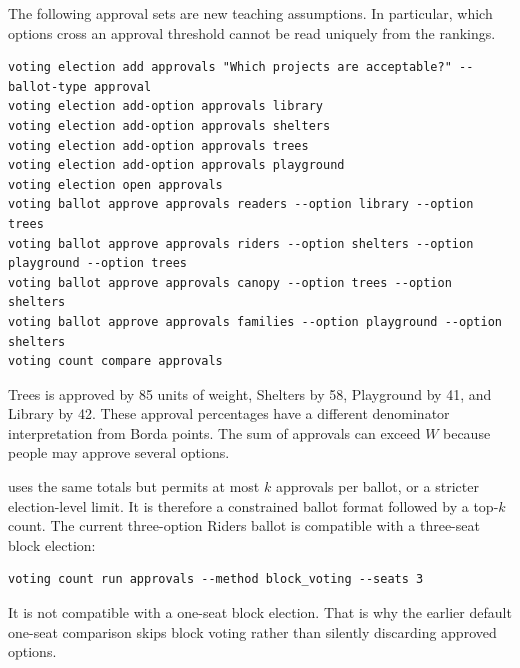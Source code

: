 The following approval sets are new teaching assumptions. In particular, which options cross an approval threshold cannot be read uniquely from the rankings.
\begin{lstlisting}[style=votingrun]
voting election add approvals "Which projects are acceptable?" --ballot-type approval
voting election add-option approvals library
voting election add-option approvals shelters
voting election add-option approvals trees
voting election add-option approvals playground
voting election open approvals
voting ballot approve approvals readers --option library --option trees
voting ballot approve approvals riders --option shelters --option playground --option trees
voting ballot approve approvals canopy --option trees --option shelters
voting ballot approve approvals families --option playground --option shelters
voting count compare approvals
\end{lstlisting}
Trees is approved by 85 units of weight, Shelters by 58, Playground by 41, and Library by 42. These approval percentages have a different denominator interpretation from Borda points. The sum of approvals can exceed $W$ because people may approve several options.

 uses the same totals but permits at most $k$ approvals per ballot, or a stricter election-level limit. It is therefore a constrained ballot format followed by a top-$k$ count. The current three-option Riders ballot is compatible with a three-seat block election:
\begin{lstlisting}[style=votingrun]
voting count run approvals --method block_voting --seats 3
\end{lstlisting}
It is not compatible with a one-seat block election. That is why the earlier default one-seat comparison skips block voting rather than silently discarding approved options.

